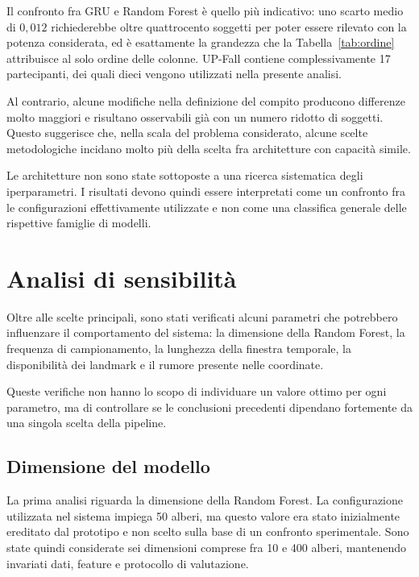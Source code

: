 Il confronto fra GRU e Random Forest è quello più indicativo: uno scarto medio di $0{,}012$ richiederebbe oltre quattrocento soggetti per poter essere rilevato con la potenza considerata, ed è esattamente la grandezza che la Tabella~\ref{tab:ordine} attribuisce al solo ordine delle colonne. UP-Fall contiene complessivamente 17 partecipanti, dei quali dieci vengono utilizzati nella presente analisi.

Al contrario, alcune modifiche nella definizione del compito producono differenze molto maggiori e risultano osservabili già con un numero ridotto di soggetti. Questo suggerisce che, nella scala del problema considerato, alcune scelte metodologiche incidano molto più della scelta fra architetture con capacità simile.

Le architetture non sono state sottoposte a una ricerca sistematica degli iperparametri. I risultati devono quindi essere interpretati come un confronto fra le configurazioni effettivamente utilizzate e non come una classifica generale delle rispettive famiglie di modelli.

\section{Analisi di sensibilità}

Oltre alle scelte principali, sono stati verificati alcuni parametri che potrebbero influenzare il comportamento del sistema: la dimensione della Random Forest, la frequenza di campionamento, la lunghezza della finestra temporale, la disponibilità dei landmark e il rumore presente nelle coordinate.

Queste verifiche non hanno lo scopo di individuare un valore ottimo per ogni parametro, ma di controllare se le conclusioni precedenti dipendano fortemente da una singola scelta della pipeline.

\subsection{Dimensione del modello}
\label{sec:dimensione}

La prima analisi riguarda la dimensione della Random Forest. La configurazione utilizzata nel sistema impiega 50 alberi, ma questo valore era stato inizialmente ereditato dal prototipo e non scelto sulla base di un confronto sperimentale. Sono state quindi considerate sei dimensioni comprese fra 10 e 400 alberi, mantenendo invariati dati, feature e protocollo di valutazione.

